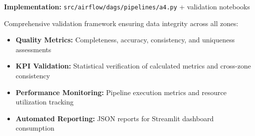 \textbf{Implementation:} \texttt{src/airflow/dags/pipelines/a4.py} + validation notebooks

Comprehensive validation framework ensuring data integrity across all zones:

\begin{itemize}[nosep]
\item \textbf{Quality Metrics:} Completeness, accuracy, consistency, and uniqueness assessments
\item \textbf{KPI Validation:} Statistical verification of calculated metrics and cross-zone consistency
\item \textbf{Performance Monitoring:} Pipeline execution metrics and resource utilization tracking
\item \textbf{Automated Reporting:} JSON reports for Streamlit dashboard consumption
\end{itemize}
